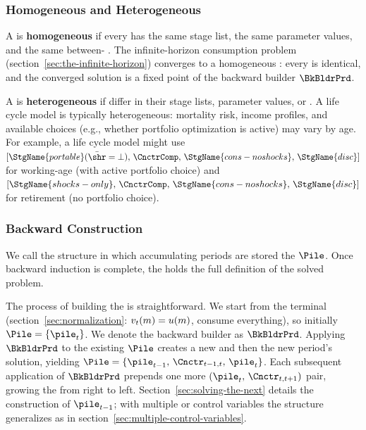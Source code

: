 \subsubsection{Homogeneous and Heterogeneous {\PilesName}}

A {\pileName} is \textbf{homogeneous} if every {\interval} has the same
stage list, the same parameter values, and the same between-{\interval}
{\Cnct}. The infinite-horizon consumption problem
(section~\ref{sec:the-infinite-horizon}) converges to a homogeneous
{\pileName}: every {\interval} is identical, and the converged solution
is a fixed point of the backward builder $\BkBldrPrd$.

A {\pileName} is \textbf{heterogeneous} if {\intervals} differ in their
stage lists, parameter values, or {\Cncts}. A life cycle model is
typically heterogeneous: mortality risk, income profiles, and available
choices (e.g., whether portfolio optimization is active) may vary by age.
For example, a life cycle model might use
$[\StgName{portable}(\bar{\shr}=\bot),\, \CnctrComp,\,
  \StgName{cons-noshocks},\, \StgName{disc}]$
for working-age {\intervals} (with active portfolio choice) and
$[\StgName{shocks-only},\, \CnctrComp,\,
  \StgName{cons-noshocks},\, \StgName{disc}]$
for retirement {\intervals} (no portfolio choice).

\subsubsection{Backward Construction}

We call the structure in which accumulating periods are stored the
{\pileName} $\Pile$. Once backward induction is complete, the {\pileName}
holds the full definition of the solved problem.

The process of building the {\pileName} is straightforward. We start from
the terminal {\interval} (section~\ref{sec:normalization}:
$v_{t}(m) = u(m)$, consume everything), so initially
$\Pile = \{\pile_{\prdT}\}$. We denote the backward builder as $\BkBldrPrd$.
Applying $\BkBldrPrd$ to the existing $\Pile$ creates a new {\Cnct} and
then the new period's solution, yielding
$\Pile = \{\pile_{\prdT-1},\, \Cnctr_{\prdT-1,\prdT},\, \pile_{\prdT}\}$.
Each subsequent application of $\BkBldrPrd$ prepends one more
$(\pile_{\prdt},\, \Cnctr_{\prdt,\prdt+1})$ pair, growing the {\pileName}
from right to left. Section~\ref{sec:solving-the-next} details the
construction of $\pile_{\prdT-1}$; with multiple {\stgs} or control
variables the structure generalizes as in
section~\ref{sec:multiple-control-variables}.

